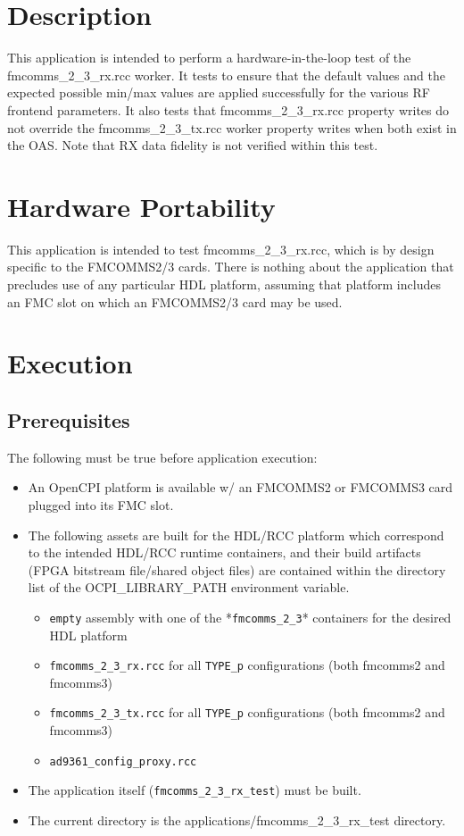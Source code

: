 \section{Description}
This application is intended to perform a hardware-in-the-loop test of the fmcomms\_2\_3\_rx.rcc worker. It tests to ensure that the default values and the expected possible min/max values are applied successfully for the various RF frontend parameters. It also tests that fmcomms\_2\_3\_rx.rcc property writes do not override the fmcomms\_2\_3\_tx.rcc worker property writes when both exist in the OAS. Note that RX data fidelity is not verified within this test.

\section{Hardware Portability}
This application is intended to test fmcomms\_2\_3\_rx.rcc, which is by design specific to the FMCOMMS2/3 cards. There is nothing about the application that precludes use of any particular HDL platform, assuming that platform includes an FMC slot on which an FMCOMMS2/3 card may be used.

\section{Execution}
\subsection{Prerequisites}
The following must be true before application execution:
\begin{itemize}
  \item An OpenCPI platform is available w/ an FMCOMMS2 or FMCOMMS3 card plugged into its FMC slot.
  \item The following assets are built for the HDL/RCC platform which correspond to the intended HDL/RCC runtime containers, and their build artifacts (FPGA bitstream file/shared object files) are contained within the directory list of the OCPI\_LIBRARY\_PATH environment variable.
  \begin{itemize}
    \item \verb+empty+ assembly with one of the *\verb+fmcomms_2_3+* containers for the desired HDL platform
    \item \verb+fmcomms_2_3_rx.rcc+ for all \verb+TYPE_p+ configurations (both fmcomms2 and fmcomms3)
    \item \verb+fmcomms_2_3_tx.rcc+ for all \verb+TYPE_p+ configurations (both fmcomms2 and fmcomms3)
    \item \verb+ad9361_config_proxy.rcc+
  \end{itemize}
  \item The application itself (\verb+fmcomms_2_3_rx_test+) must be built.
  \item The current directory is the applications/fmcomms\_2\_3\_rx\_test directory.
\end{itemize}
